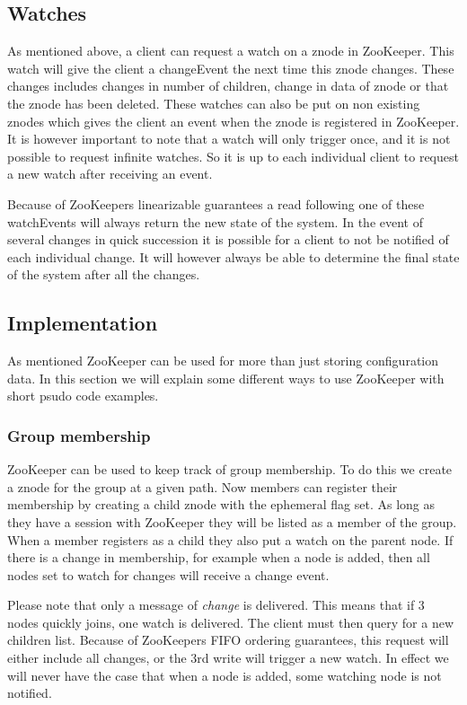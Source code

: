 \subsection{Watches}
As mentioned above, a client can request a watch on a znode in ZooKeeper. This watch will give the client a changeEvent the next time this znode changes. These changes includes changes in number of children, change in data of znode or that the znode has been deleted. These watches can also be put on non existing znodes which gives the client an event when the znode is registered in ZooKeeper. It is however important to note that a watch will only trigger once, and it is not possible to request infinite watches. So it is up to each individual client to request a new watch after receiving an event.

Because of ZooKeepers linearizable guarantees a read following one of these watchEvents will always return the new state of the system. In the event of several changes in quick succession it is possible for a client to not be notified of each individual change. It will however always be able to determine the final state of the system after all the changes.

\subsection{Implementation}

As mentioned ZooKeeper can be used for more than just storing configuration data. In this section we will explain some different ways to use ZooKeeper with short psudo code examples. 

\subsubsection{Group membership}
ZooKeeper can be used to keep track of group membership. To do this we create a znode for the group at a given path. Now members can register their membership by creating a child znode with the ephemeral flag set. As long as they have a session with ZooKeeper they will be listed as a member of the group. When a member registers as a child they also put a watch on the parent node. If there is a change in membership, for example when a node is added, then all nodes set to watch for changes will receive a change event.

Please note that only a message of \emph{change} is delivered. This means that if 3 nodes quickly joins, one watch is delivered. The client must then query for a new children list. Because of ZooKeepers FIFO ordering guarantees, this request will either include all changes, or the 3rd write will trigger a new watch. In effect we will never have the case that when a node is added, some watching node is not notified. 

